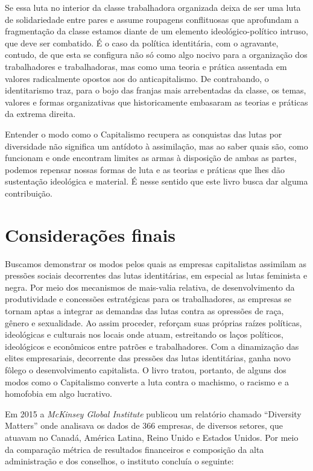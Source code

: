 Se essa luta no interior da classe trabalhadora organizada deixa de ser
uma luta de solidariedade entre pares e assume roupagens conflituosas
que aprofundam a fragmentação da classe estamos diante de um elemento
ideológico-político intruso, que deve ser combatido. É o caso da
política identitária, com o agravante, contudo, de que esta se configura
não só como algo nocivo para a organização dos trabalhadores e
trabalhadoras, mas como uma teoria e prática assentada em valores
radicalmente opostos aos do anticapitalismo. De contrabando, o
identitarismo traz, para o bojo das franjas mais arrebentadas da classe,
os temas, valores e formas organizativas que historicamente embasaram as
teorias e práticas da extrema direita.

Entender o modo como o Capitalismo recupera as conquistas das lutas por
diversidade não significa um antídoto à assimilação, mas ao saber quais
são, como funcionam e onde encontram limites as armas à disposição de
ambas as partes, podemos repensar nossas formas de luta e as teorias e
práticas que lhes dão sustentação ideológica e material. É nesse sentido
que este livro busca dar alguma contribuição.

\chapter{Considerações finais}

Buscamos demonstrar os modos pelos quais as empresas capitalistas
assimilam as pressões sociais decorrentes das lutas identitárias, em
especial as lutas feminista e negra. Por meio dos mecanismos de
mais-valia relativa, de desenvolvimento da produtividade e concessões
estratégicas para os trabalhadores, as empresas se tornam aptas a
integrar as demandas das lutas contra as opressões de raça, gênero e
sexualidade. Ao assim proceder, reforçam suas próprias raízes políticas,
ideológicas e culturais nos locais onde atuam, estreitando os laços
políticos, ideológicos e econômicos entre patrões e trabalhadores. Com a
dinamização das elites empresariais, decorrente das pressões das lutas
identitárias, ganha novo fôlego o desenvolvimento capitalista. O livro
tratou, portanto, de alguns dos modos como o Capitalismo converte a luta
contra o machismo, o racismo e a homofobia em algo lucrativo.

Em 2015 a \emph{McKinsey Global Institute} publicou um relatório chamado
``Diversity Matters'' onde analisava os dados de 366 empresas, de
diversos setores, que atuavam no Canadá, América Latina, Reino Unido e
Estados Unidos. Por meio da comparação métrica de resultados financeiros
e composição da alta administração e dos conselhos, o instituto concluía
o seguinte:

